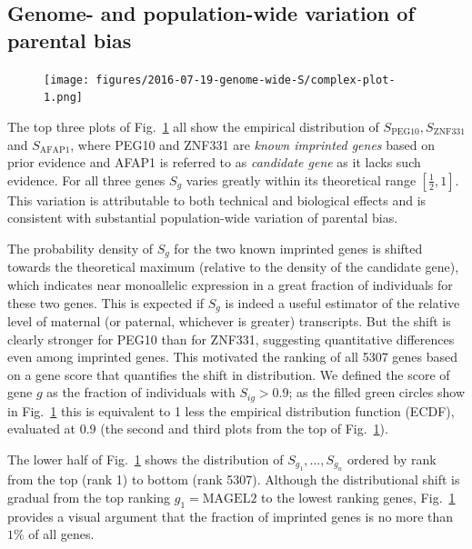 \documentclass[letterpaper]{article}
\begin{document}
\subsection{Genome- and population-wide variation of parental bias}

\begin{figure}
\begin{center}
\texttt{[image: figures/2016-07-19-genome-wide-S/complex-plot-1.png]}
\end{center}
\caption{}
\label{fig:ranking-genes}
\end{figure}

The top three plots of Fig.~\ref{fig:ranking-genes} all show the empirical distribution
of \(S_\mathrm{PEG10}, S_\mathrm{ZNF331}\) and \(S_\mathrm{AFAP1}\), where
PEG10 and ZNF331 are \emph{known imprinted genes} based on prior evidence and
AFAP1 is referred to as \emph{candidate gene} as it lacks such evidence.  For
all three genes \(S_g\) varies greatly within its theoretical range
\([\frac{1}{2}, 1]\).  This variation is attributable to both technical and biological effects
and is consistent with substantial population-wide variation of parental bias.

The probability density of \(S_g\) for the two known imprinted
genes is shifted towards the theoretical maximum (relative to the density of
the candidate gene), which indicates near monoallelic expression in a great
fraction of individuals for these two genes.  This is expected if \(S_g\) is
indeed a useful estimator of the relative level of maternal (or paternal,
whichever is greater) transcripts.  But the shift is clearly
stronger for PEG10 than for ZNF331, suggesting quantitative differences even
among imprinted genes.  This motivated the ranking of all 5307 genes
based on a gene score that quantifies the shift in distribution.  We defined the score of
gene \(g\) as the fraction of individuals with \(S_{ig}>0.9\); as the filled green
circles show in Fig.~\ref{fig:ranking-genes} this is equivalent to 1 less the
empirical distribution function (ECDF), evaluated at \(0.9\) (the second and
third plots from the top of Fig.~\ref{fig:ranking-genes}).

The lower half of Fig.~\ref{fig:ranking-genes} shows the distribution of
\(S_{g_1},...,S_{g_{n}}\) ordered by rank from the top (rank 1) to bottom
(rank 5307).  Although the distributional shift is gradual from the top ranking
\(g_1=\mathrm{MAGEL2}\) to the lowest ranking genes,
Fig.~\ref{fig:ranking-genes} provides a visual argument that the fraction of
imprinted genes is no more than \(1\%\) of all genes.
\end{document}
